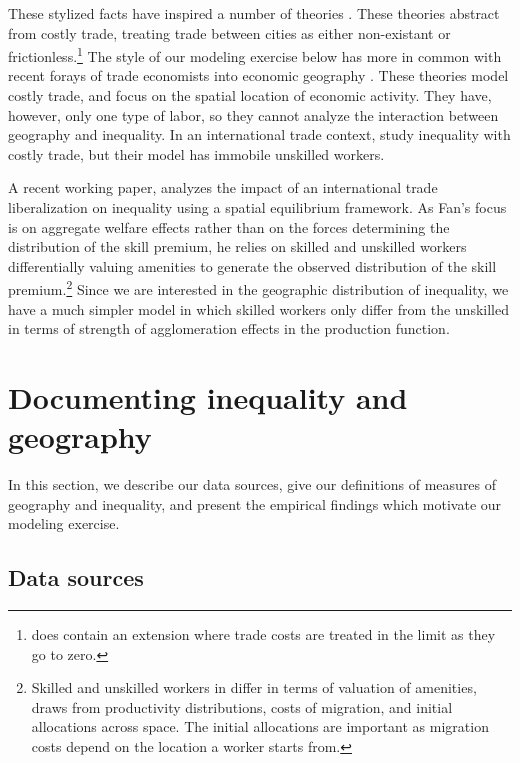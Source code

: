 \documentclass[12 pt]{article}
\begin{document}
These stylized facts have inspired a number of theories \citep{davis2012spatial,davis2014comparative,baum2012understanding,combes2012sorting}.  These theories abstract from costly trade, treating trade between cities as either non-existant or frictionless.\footnote{\citet{davis2012spatial} does contain an extension where trade costs are treated in the limit as they go to zero.}  The style of our modeling exercise below has more in common with recent forays of trade economists into economic geography \citep{allen2014trade,desmet2014geography,fajgelbaum2015state}.  These theories model costly trade, and focus on the spatial location of economic activity. They have, however, only one type of labor, so they cannot analyze the interaction between geography and inequality.  In an international trade context, \citet{fujita2006globalization} study inequality with costly trade, but their model has immobile unskilled workers.

A recent working paper, \citet{fan2015internal} analyzes the impact of an international trade liberalization on inequality using a spatial equilibrium framework.  As Fan's focus is on aggregate welfare effects rather than on the forces determining the distribution of the skill premium, he relies on skilled and unskilled workers differentially valuing amenities to generate the observed distribution of the skill premium.\footnote{Skilled and unskilled workers in \citet{fan2015internal} differ in terms of valuation of amenities, draws from productivity distributions, costs of migration, and initial allocations across space.  The initial allocations are important as migration costs depend on the location a worker starts from.}  Since we are interested in the geographic distribution of inequality, we have a much simpler model in which skilled workers only differ from the unskilled in terms of strength of agglomeration effects in the production function.

\section{Documenting inequality and geography}

In this section, we describe our data sources, give our definitions of measures of geography and inequality, and present the empirical findings which motivate our modeling exercise.

\subsection{Data sources}
\end{document}
